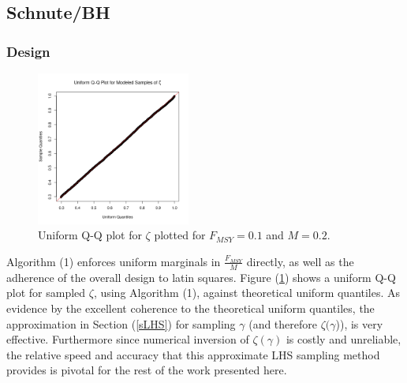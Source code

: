 \documentclass[12pt]{article}
\begin{document}

%
\subsection{Schnute/BH}

%
\subsubsection{Design}


%
\begin{figure}
\vspace{-2cm}
\includegraphics[width=0.45\textwidth]{../gpBias/qqUnif.png}
\vspace{-1cm} %
\caption{Uniform Q-Q plot for $\zeta$ plotted for $F_{MSY}=0.1$ and $M=0.2$.}
\label{qqZeta}
\end{figure}

%
Algorithm (1) enforces uniform marginals in $\frac{F_{MSY}}{M}$ directly, as well
as the adherence of the overall design to latin squares.  
Figure (\ref{qqZeta}) shows a uniform Q-Q plot for sampled $\zeta$, using 
Algorithm (1), against theoretical uniform quantiles. As evidence by the 
excellent coherence to the theoretical uniform quantiles, the approximation
in Section (\ref{sLHS}) for sampling $\gamma$ (and therefore $\zeta(\gamma$)), 
is very effective. 
Furthermore since numerical inversion of $\zeta(\gamma)$ is costly and 
unreliable, the relative speed and accuracy that this approximate LHS sampling 
method provides is pivotal for the rest of the work presented here. %

%
\end{document}
